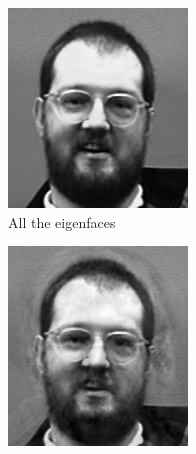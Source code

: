 \begin{figure}
\begin{subfigure}[b]{0.3\textwidth}
\includegraphics[width=\textwidth]{rebuiltAll.png}
\caption{All the eigenfaces}
\end{subfigure}
\begin{subfigure}[b]{0.3\textwidth}
\includegraphics[width=\textwidth]{rebuiltHalf.png}

\end{subfigure}
\end{figure}
